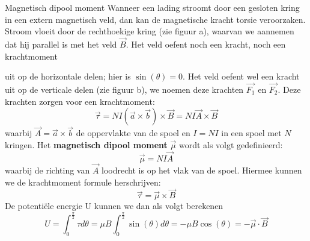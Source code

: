 \begin{theo}{Magnetisch dipool moment}
    Wanneer een lading stroomt door een gesloten kring in een extern magnetisch veld, dan kan de magnetische kracht torsie veroorzaken.
    Stroom vloeit door de rechthoekige kring (zie figuur a), waarvan we aannemen dat hij parallel is met het veld $\Vec{B}$.
    Het veld oefent noch een kracht, noch een krachtmoment 

    \vspace{-0.3cm}
    \hspace{-0.5cm}\begin{minipage}{0.79\textwidth}
        uit op de horizontale delen; hier is $\sin(\theta) = 0$. Het veld oefent wel een kracht uit op de verticale delen
        (zie figuur b), we noemen deze krachten $\Vec{F_1}$ en $\Vec{F_2}$. Deze krachten zorgen voor een krachtmoment:
        \begin{equation*}
            \Vec{\tau} = NI(\Vec{a} \times \Vec{b}) \times \Vec{B} = NI\Vec{A} \times \Vec{B}
        \end{equation*}
        waarbij $\Vec{A} = \Vec{a} \times \Vec{b}$ de oppervlakte van de spoel en $I = NI$ in een spoel met $N$ kringen.
        Het \textbf{magnetisch dipool moment} $\Vec{\mu}$ wordt als volgt gedefinieerd:
        \begin{equation*}
            \Vec{\mu} = NI\Vec{A}
        \end{equation*}
        waarbij de richting van $\Vec{A}$ loodrecht is op het vlak van de spoel. Hiermee kunnen we de krachtmoment formule herschrijven:
        \begin{equation*}
            \Vec{\tau} = \Vec{\mu} \times \Vec{B}
        \end{equation*}
        De potentiële energie U kunnen we dan als volgt berekenen
        \begin{equation*}
            U = \int_0^{\tfrac{\pi}{2}} \tau d\theta = \mu B \int_0^{\tfrac{\pi}{2}} \sin(\theta) d\theta = -\mu B\cos(\theta) = -\Vec{\mu} \cdot \Vec{B}
        \end{equation*}
        

\end{minipage}
\end{theo}
